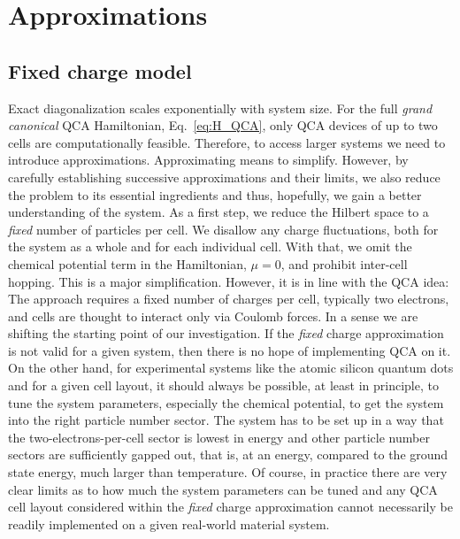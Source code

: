 \chapter{Approximations}
\graphicspath{{../gfx/chapter02/}{../plots/chapter02/}}


\section{Fixed charge model}

Exact diagonalization scales exponentially with system size. For the full
\emph{grand canonical} QCA Hamiltonian, Eq.~\ref{eq:H_QCA}, only QCA devices of
up to two cells are computationally feasible. Therefore, to access larger
systems we need to introduce approximations. Approximating means to simplify.
However, by carefully establishing successive approximations and their limits,
we also reduce the problem to its essential ingredients and thus, hopefully, we
gain a better understanding of the system. As a first step, we reduce the
Hilbert space to a \emph{fixed} number of particles per cell. We disallow any
charge fluctuations, both for the system as a whole and for each individual
cell. With that, we omit the chemical potential term in the Hamiltonian, $\mu =
0$, and prohibit inter-cell hopping. This is a major simplification. However, it
is in line with the QCA idea: The approach requires a fixed number of charges
per cell, typically two electrons, and cells are thought to interact only via
Coulomb forces. In a sense we are shifting the starting point of our
investigation. If the \emph{fixed} charge approximation is not valid for a given
system, then there is no hope of implementing QCA on it. On the other hand, for
experimental systems like the atomic silicon quantum dots and for a given cell
layout, it should always be possible, at least in principle, to tune the system
parameters, especially the chemical potential, to get the system into the right
particle number sector. The system has to be set up in a way that the
two-electrons-per-cell sector is lowest in energy and other particle number
sectors are sufficiently gapped out, that is, at an energy, compared to the
ground state energy, much larger than temperature. Of course, in practice there
are very clear limits as to how much the system parameters can be tuned and any
QCA cell layout considered within the \emph{fixed} charge approximation cannot
necessarily be readily implemented on a given real-world material system.

